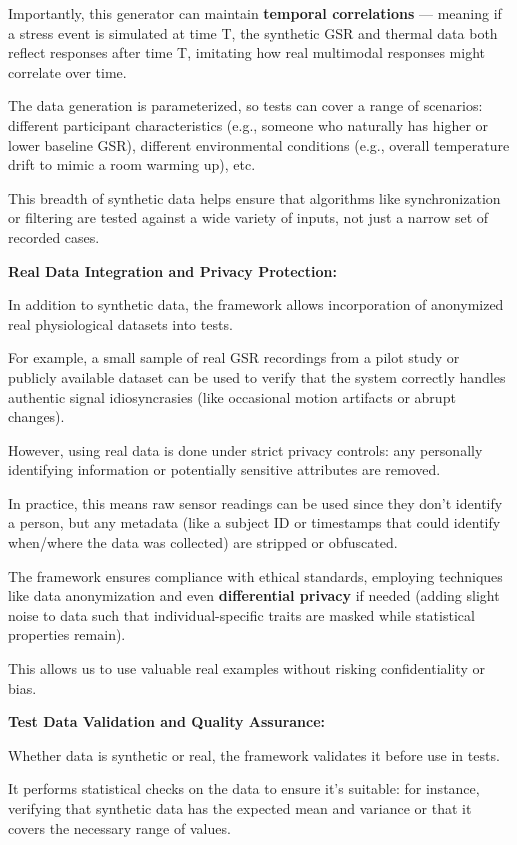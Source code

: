 {{Importantly, this generator can maintain \textbf{temporal correlations}
 --- meaning if a stress event is simulated at time T, the synthetic GSR and thermal
 data both reflect responses after time T, imitating how real multimodal responses
 might correlate over time.

The data generation is parameterized, so tests can cover a range of scenarios:
different participant characteristics (e.g., someone who naturally has higher or
lower baseline GSR), different environmental conditions (e.g., overall temperature
drift to mimic a room warming up), etc.

This breadth of synthetic data helps ensure that algorithms like synchronization or
filtering are tested against a wide variety of inputs, not just a narrow set of
recorded cases.

\textbf{Real Data Integration and Privacy Protection:}

In addition to synthetic data, the framework allows incorporation of anonymized real
physiological datasets into tests.

For example, a small sample of real GSR recordings from a pilot study or publicly
available dataset can be used to verify that the system correctly handles authentic
signal idiosyncrasies (like occasional motion artifacts or abrupt changes).

However, using real data is done under strict privacy controls: any personally
identifying information or potentially sensitive attributes are removed.

In practice, this means raw sensor readings can be used since they don't identify a
person, but any metadata (like a subject ID or timestamps that could identify
when/where the data was collected) are stripped or obfuscated.

The framework ensures compliance with ethical standards, employing techniques like
data anonymization and even \textbf{differential privacy}
 if needed (adding slight noise to data such that individual-specific traits are
 masked while statistical properties remain).

This allows us to use valuable real examples without risking confidentiality or bias.

\textbf{Test Data Validation and Quality Assurance:}

Whether data is synthetic or real, the framework validates it before use in tests.

It performs statistical checks on the data to ensure it's suitable: for instance,
verifying that synthetic data has the expected mean and variance or that it covers
the necessary range of values.

}}
